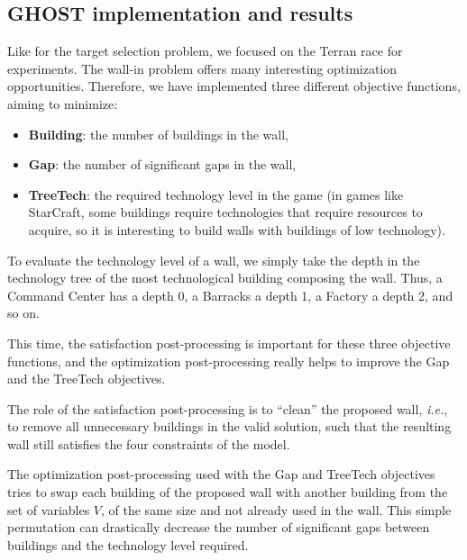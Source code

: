 \documentclass[journal]{IEEEtran}
\newcommand{\ghost}{\textsc{GHOST}\xspace}
\newcommand{\ie}{\textit{i.e.}}
\begin{document}
\subsection{\ghost implementation and results}

Like for the  target selection problem, we focused on  the Terran race
for  experiments.    The  wall-in  problem  offers   many  interesting
optimization  opportunities.   Therefore,  we have  implemented  three
different objective functions, aiming to minimize:
\begin{itemize}
\item {\bf Building}: the number of buildings in the wall,
\item {\bf Gap}: the number of significant gaps in the wall,
\item {\bf  TreeTech}: the required  technology level in the  game (in
  games  like  StarCraft,  some buildings  require  technologies  that
  require resources  to acquire, so  it is interesting to  build walls
  with buildings of low technology).
\end{itemize}

To evaluate the  technology level of a wall, we  simply take the depth
in the  technology tree of  the most technological  building composing
the wall. Thus, a Command Center has  a depth 0, a Barracks a depth 1,
a Factory a depth 2, and so on.

This  time, the  satisfaction post-processing  is important  for these
three objective functions, and the optimization post-processing really
helps to improve the Gap and the TreeTech objectives.

The  role of  the  satisfaction post-processing  is  to ``clean''  the
proposed wall, \ie,  to remove all unnecessary buildings  in the valid
solution,  such  that the  resulting  wall  still satisfies  the  four
constraints of the model.

The  optimization  post-processing  used  with the  Gap  and  TreeTech
objectives  tries to  swap each  building  of the  proposed wall  with
another building from  the set of variables $V$, of  the same size and
not already used in the  wall. This simple permutation can drastically
decrease  the number  of significant  gaps between  buildings and  the
technology level required.
\end{document}
